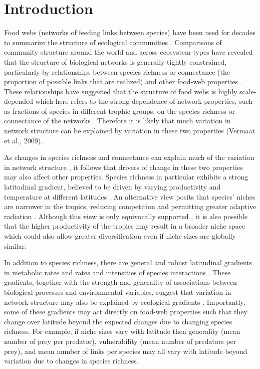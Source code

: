 \section*{Introduction}

Food webs (networks of feeding links between species) have been used for decades to summarize the structure of ecological communities \citep{Martinez2000,earlierwork}.
Comparisons of community structure around the world and across ecosystem types 
have revealed that the structure of biological networks is generally tightly
constrained, particularly by relationships between species richness or connectance
(the proportion of possible links that are realized) and other food-web properties \citep{Riede2010}.
These relationships have suggested that the structure of food webs is highly scale-depended which here refers to the
strong dependence of network properties, such as fractions of
species in different trophic groups, on the species richness or connectance of
the networks \citep{Riede2010}. Therefore it is likely that much variation in network structure
can be explained by variation in these two properties (Vermaat et al., 2009).


As changes in species richness and connectance can explain much of the variation in network structure \citep{Vermaat2009}, 
it follows that drivers of change in these two properties may also affect other properties. Species richness in particular 
exhibits a strong latitudinal gradient, believed to be driven by varying productivity and temperature at different latitudes 
\citep{Brown2004,Cardillo2005,Thompson2005,Davies2007}. An alternative view
posits that species' niches are narrower in the tropics, 
reducing competition and permitting greater adaptive radiation \citep{}. Although this view is only equivocally supported 
\citep{Vazquez2004}, it is also possible that the higher productivity of the tropics \citep{Brown2004} may result in a broader 
niche space \citep{Davies2007} which could also allow greater diversification even if niche sizes are globally similar.


In addition to species richness, there are general and robust latitudinal gradients in metabolic rates \citep{Stegen2012} and 
rates and intensities of species interactions \citep{Marquis2005,Schemske2009}. These gradients, together with the strength and 
generality of associations between biological processes and environmental variables, suggest that variation in network structure 
may also be explained by ecological gradients \citep{Baiser2011}. Importantly, some of these gradients may act directly 
on food-web properties such that they change over latitude beyond the expected changes due to changing species richness. For 
example, if niche sizes vary with latitude then generality (mean number of prey per predator), vulnerability (mean number of 
predators per prey), and mean number of links per species may all vary with latitude beyond variation due to changes in species
richness.


